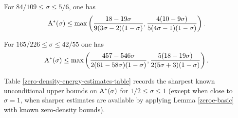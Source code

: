 \begin{theorem}\label{imp-energy-bound8}
For $84/109 \le \sigma \le 5/6$, one has
\[
\mathrm{A}^*(\sigma) \le \max\left(\frac{18 - 19\sigma}{9(3\sigma - 2)(1 - \sigma)}, \frac{4(10 - 9\sigma)}{5(4\sigma - 1)(1 - \sigma)}\right).
\]
\end{theorem}
\derived
{}


\begin{theorem}\label{ze-guthmaynard-thm2}
For $165/226 \le \sigma \le 42/55$ one has
\[
\mathrm{A}^*(\sigma) \le \max\left(\frac{457 - 546\sigma}{2(61 - 58\sigma)(1 - \sigma)}, \frac{5(18 - 19\sigma)}{2(5\sigma + 3)(1 - \sigma)}\right).
\]
\end{theorem}
\derived
{}


Table \ref{zero-density-energy-estimates-table} records the sharpest known unconditional upper bounds on $\mathrm{A}^*(\sigma)$ for $1/2 \le \sigma \le 1$ (except when close to $\sigma = 1$, when sharper estimates are available by applying Lemma \ref{zeroe-basic} with known zero-density bounds).
